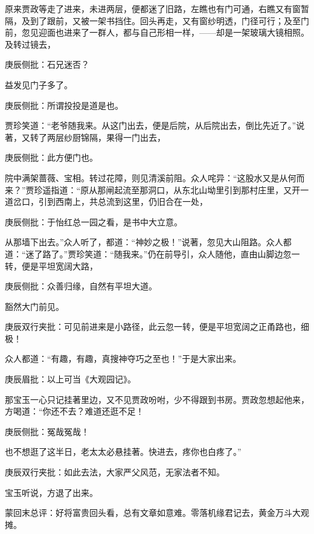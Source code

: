 \begin{parag}


    原来贾政等走了进来，未进两层，便都迷了旧路，左瞧也有门可通，右瞧又有窗暂隔，及到了跟前，又被一架书挡住。回头再走，又有窗纱明透，门径可行；及至门前，忽见迎面也进来了一群人，都与自己形相一样，——却是一架玻璃大镜相照。及转过镜去，\begin{note}庚辰侧批：石兄迷否？\end{note}益发见门子多了。\begin{note}庚辰侧批：所谓投投是道是也。\end{note}贾珍笑道：“老爷随我来。从这门出去，便是后院，从后院出去，倒比先近了。”说著，又转了两层纱厨锦隔，果得一门出去，\begin{note}庚辰侧批：此方便门也。\end{note}院中满架蔷薇、宝相。转过花障，则见清溪前阻。众人咤异：“这股水又是从何而来？”贾珍遥指道：“原从那闸起流至那洞口，从东北山坳里引到那村庄里，又开一道岔口，引到西南上，共总流到这里，仍旧合在一处，\begin{note}庚辰侧批：于怡红总一园之看，是书中大立意。\end{note}从那墙下出去。”众人听了，都道：“神妙之极！”说著，忽见大山阻路。众人都道：“迷了路了。”贾珍笑道：“随我来。”仍在前导引，众人随他，直由山脚边忽一转，便是平坦宽阔大路，\begin{note}庚辰侧批：众善归缘，自然有平坦大道。\end{note}豁然大门前见。\begin{note}庚辰双行夹批：可见前进来是小路径，此云忽一转，便是平坦宽阔之正甬路也，细极！\end{note}众人都道：“有趣，有趣，真搜神夺巧之至也！”于是大家出来。\begin{note}庚辰眉批：以上可当《大观园记》。\end{note}那宝玉一心只记挂著里边，又不见贾政吩咐，少不得跟到书房。贾政忽想起他来，方喝道：“你还不去？难道还逛不足！\begin{note}庚辰侧批：冤哉冤哉！\end{note}也不想逛了这半日，老太太必悬挂著。快进去，疼你也白疼了。”\begin{note}庚辰双行夹批：如此去法，大家严父风范，无家法者不知。\end{note}宝玉听说，方退了出来。
\end{parag}


\begin{parag}


    \begin{note}蒙回末总评：好将富贵回头看，总有文章如意难。零落机缘君记去，黄金万斗大观摊。\end{note}
\end{parag}


